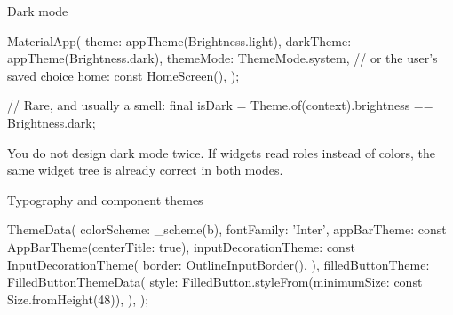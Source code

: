 \documentclass[10pt,aspectratio=169,t]{beamer}
\begin{document}
\begin{frame}[fragile,eyebrow=Theming]{Dark mode}
\begin{dart}
MaterialApp(
  theme: appTheme(Brightness.light),
  darkTheme: appTheme(Brightness.dark),
  themeMode: ThemeMode.system,   // or the user's saved choice
  home: const HomeScreen(),
);

// Rare, and usually a smell:
final isDark = Theme.of(context).brightness == Brightness.dark;
\end{dart}
  \begin{takeaway}{You do not design dark mode twice.}
    If widgets read roles instead of colors, the same widget tree is already correct in both modes.
  \end{takeaway}
\end{frame}

\begin{frame}[fragile,eyebrow=Theming]{Typography and component themes}
\begin{dart}
ThemeData(
  colorScheme: _scheme(b),
  fontFamily: 'Inter',
  appBarTheme: const AppBarTheme(centerTitle: true),
  inputDecorationTheme: const InputDecorationTheme(
    border: OutlineInputBorder(),
  ),
  filledButtonTheme: FilledButtonThemeData(
    style: FilledButton.styleFrom(minimumSize: const Size.fromHeight(48)),
  ),
);
\end{dart}
  \vskip 1mm
\end{frame}
\end{document}
